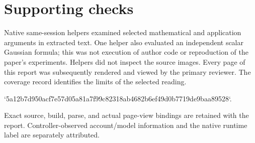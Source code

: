 \documentclass[10pt]{article}
\begin{document}
\section*{Supporting checks}
Native same-session helpers examined selected mathematical and application arguments in extracted text. One helper also evaluated an independent scalar Gaussian formula; this was not execution of author code or reproduction of the paper’s experiments. Helpers did not inspect the source images. Every page of this report was subsequently rendered and viewed by the primary reviewer. The coverage record identifies the limits of the selected reading.\par
`5a12b7d950acf7e57d05a81a7f99c82318ab4682b6ef49d0b7719de9baa89528`.\par
Exact source, build, parse, and actual page-view bindings are retained with the report. Controller-observed account/model information and the native runtime label are separately attributed.\par
\end{document}
